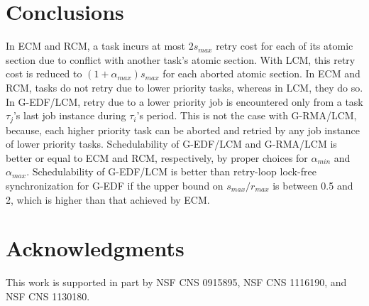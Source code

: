 \documentclass[letter]{sig-alternate}
\begin{document}
\section{Conclusions}
\label{sec:conclusions_lcm}

In ECM and RCM, a task incurs at most $2s_{max}$ retry cost for each of its atomic section due to conflict
with another task's atomic section. With LCM, this retry cost is reduced to $(1+\alpha_{max})s_{max}$ for each aborted atomic section. In ECM and RCM, tasks do not retry due to lower priority tasks, whereas in LCM, they do so. In G-EDF/LCM, retry due to a lower priority job is encountered only from a task $\tau_{j}$'s last job instance 
during $\tau_{i}$'s period. This is not the case with G-RMA/LCM, because,  each higher priority task can be aborted and retried by any job instance of lower priority tasks. Schedulability of G-EDF/LCM and G-RMA/LCM is better or equal to ECM and RCM, respectively, by proper choices for $\alpha_{min}$ and $\alpha_{max}$. Schedulability of G-EDF/LCM is better than retry-loop lock-free synchronization for G-EDF if the upper bound on $s_{max}/r_{max}$ is between 0.5 and 2, which is higher than that achieved by ECM.

\section*{Acknowledgments}
\label{sec:ack}
This work is supported in part by NSF CNS 0915895, NSF CNS 1116190,  and NSF CNS 1130180.

%
%
\end{document}
